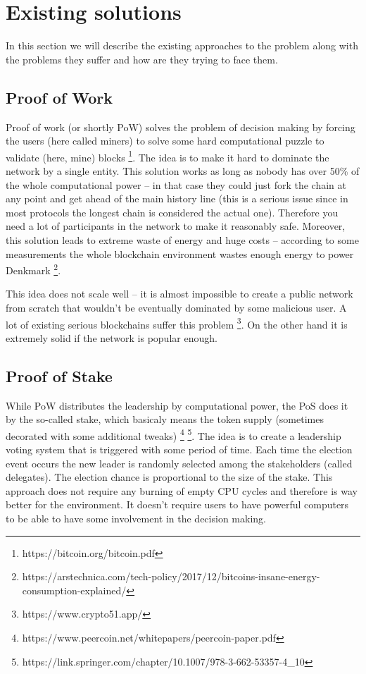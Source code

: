 \section{Existing solutions}

In this section we will describe the existing approaches to the problem along
with the problems they suffer and how are they trying to face them.

\subsection{Proof of Work}

Proof of work (or shortly PoW) solves the problem of decision making by forcing the
users (here called miners) to solve some hard computational puzzle to validate
(here, mine) blocks \footnote{https://bitcoin.org/bitcoin.pdf}.
The idea is to make it hard to dominate the network by a
single entity. This solution works as long as nobody has over 50\% of the whole
computational power – in that case they could just fork the chain at any point
and get ahead of the main history line (this is a serious issue since in most
protocols the longest chain is considered the actual one). Therefore you need a
lot of participants in the network to make it reasonably safe. Moreover, this
solution leads to extreme waste of energy and huge costs – according to some
measurements the whole blockchain environment wastes enough energy to power
Denkmark
\footnote{https://arstechnica.com/tech-policy/2017/12/bitcoins-insane-energy-consumption-explained/}.

This idea does not scale well – it is almost impossible to create a public
network from scratch that wouldn't be eventually dominated by some malicious
user. A lot of existing serious blockchains suffer this problem
\footnote{https://www.crypto51.app/}. On the other hand it is extremely solid if
the network is popular enough.

\subsection{Proof of Stake}

While PoW distributes the leadership by computational power, the PoS does it by
the so-called stake, which basicaly means the token supply (sometimes decorated
with some additional tweaks)
\footnote{https://www.peercoin.net/whitepapers/peercoin-paper.pdf}
\footnote{https://link.springer.com/chapter/10.1007/978-3-662-53357-4\_10}.
The idea is to create a leadership voting system
that is triggered with some period of time. Each time the election event occurs
the new leader is randomly selected among the stakeholders (called delegates).
The election chance is proportional to the size of the stake. This approach does
not require any burning of empty CPU cycles and therefore is way better for the
environment. It doesn't require users to have powerful computers to be able to
have some involvement in the decision making.

